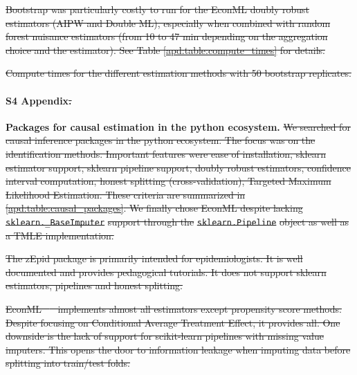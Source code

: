 \documentclass[10pt,letterpaper]{article}
\providecommand{\DIFdeltex}[1]{{\protect\color{red}\sout{#1}}}                      %
\providecommand{\DIFdelbegin}{} %
\providecommand{\DIFdelend}{} %
\providecommand{\DIFdelFL}[1]{\DIFdel{#1}} %
\providecommand{\DIFdel}[1]{\texorpdfstring{\DIFdeltex{#1}}{}} %
\newcommand{\DIFscaledelfig}{0.5}
\newlength{\DIFdelgraphicswidth} %
\newlength{\DIFdelgraphicsheight} %
\newcommand{\DIFdelincludegraphics}[2][]{%
\sbox{\DIFdelgraphicsbox}{\DIFOincludegraphics[#1]{#2}}%
\settoboxwidth{\DIFdelgraphicswidth}{\DIFdelgraphicsbox} %
\settoboxtotalheight{\DIFdelgraphicsheight}{\DIFdelgraphicsbox} %
\scalebox{\DIFscaledelfig}{%
\parbox[b]{\DIFdelgraphicswidth}{\usebox{\DIFdelgraphicsbox}\\[-\baselineskip] \rule{\DIFdelgraphicswidth}{0em}}\llap{\resizebox{\DIFdelgraphicswidth}{\DIFdelgraphicsheight}{%
\setlength{\unitlength}{\DIFdelgraphicswidth}%
\begin{picture}(1,1)%
\thicklines\linethickness{2pt} %
{\color[rgb]{1,0,0}\put(0,0){\framebox(1,1){}}}%
{\color[rgb]{1,0,0}\put(0,0){\line( 1,1){1}}}%
{\color[rgb]{1,0,0}\put(0,1){\line(1,-1){1}}}%
\end{picture}%
}\hspace*{3pt}}} %
} %
\DeclareRobustCommand{\DIFdelbegin}{\DIFOdelbegin \let\includegraphics\DIFdelincludegraphics} %
\DeclareRobustCommand{\DIFdelend}{\DIFOaddend \let\includegraphics\DIFOincludegraphics} %
\begin{document}
\DIFdel{Bootstrap was particularly costly to run for the EconML doubly robust
  estimators (AIPW and Double ML), especially when combined with random forest nuisance
  estimators (from 10 to 47 min depending on the aggregation choice and the
  estimator). See Table \ref{apd:table:compute_times} for details.
}%

{%
  \DIFdelFL{Compute times for the different estimation methods with 50 bootstrap replicates.}}%

\DIFdelend \paragraph*{S4 Appendix\DIFdelbegin \DIFdel{.}\DIFdelend }
\label{apd:packages}
{\bf Packages for causal estimation in the python ecosystem.}
\DIFdelbegin \DIFdel{We searched for causal inference packages in the python ecosystem. The focus
  was on the identification methods. Important features were ease of
  installation, sklearn estimator support, sklearn pipeline support, doubly
  robust estimators, confidence interval computation, honest splitting
  (cross-validation), Targeted Maximum Likelihood Estimation. These criteria are
  summarized in \ref{apd:table:causal_packages}. We finally chose EconML despite
  lacking }\texttt{\DIFdel{sklearn.\_BaseImputer}} %
\DIFdel{support through the
}\texttt{\DIFdel{sklearn.Pipeline}} %
\DIFdel{object as well as a TMLE implementation.
}%

\DIFdel{The zEpid package is primarily intended for epidemiologists. It is well documented
  and provides pedagogical tutorials. It does not support sklearn estimators,
  pipelines and honest splitting.
}%

\DIFdel{EconML \mbox{%
    \cite{battocchi2019econml} }\hskip0pt%
  implements almost all estimators except propensity score methods. Despite
  focusing on Conditional Average Treatment Effect, it provides all. One downside
  is the lack of support for scikit-learn pipelines with missing value imputers.
  This opens the door to information leakage when imputing data before splitting
  into train/test folds.
}%
\end{document}
